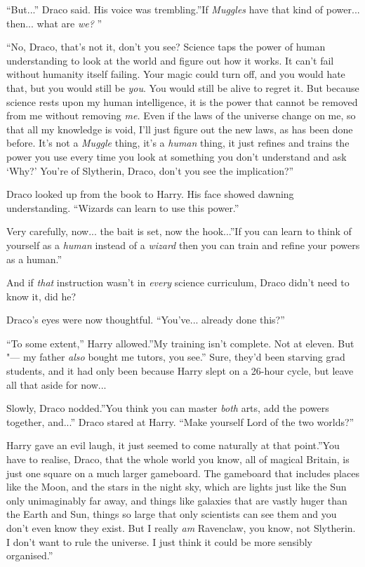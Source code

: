 ``But...'' Draco said. His voice was trembling.''If \emph{Muggles}
have that kind of power... then... what are \emph{we?} ''

``No, Draco, that's not it, don't you see? Science taps the power of
human understanding to look at the world and figure out how it works. It
can't fail without humanity itself failing. Your magic could turn off,
and you would hate that, but you would still be \emph{you}. You would
still be alive to regret it. But because science rests upon my human
intelligence, it is the power that cannot be removed from me without
removing \emph{me.} Even if the laws of the universe change on me, so
that all my knowledge is void, I'll just figure out the new laws, as has
been done before. It's not a \emph{Muggle} thing, it's a \emph{human}
thing, it just refines and trains the power you use every time you look
at something you don't understand and ask `Why?' You're of Slytherin,
Draco, don't you see the implication?''

Draco looked up from the book to Harry. His face showed dawning
understanding. ``Wizards can learn to use this power.''

Very carefully, now... the bait is set, now the hook...''If
you can learn to think of yourself as a \emph{human} instead of a
\emph{wizard} then you can train and refine your powers as a human.''

And if \emph{that} instruction wasn't in \emph{every} science
curriculum, Draco didn't need to know it, did he?

Draco's eyes were now thoughtful. ``You've... already done this?''

``To some extent,'' Harry allowed.''My training isn't complete. Not at
eleven. But "--- my father \emph{also} bought me tutors, you see.'' Sure,
they'd been starving grad students, and it had only been because Harry
slept on a 26-hour cycle, but leave all that aside for now...

Slowly, Draco nodded.''You think you can master \emph{both} arts, add
the powers together, and...'' Draco stared at Harry. ``Make
yourself Lord of the two worlds?''

Harry gave an evil laugh, it just seemed to come naturally at that
point.''You have to realise, Draco, that the whole world you know, all
of magical Britain, is just one square on a much larger gameboard. The
gameboard that includes places like the Moon, and the stars in the night
sky, which are lights just like the Sun only unimaginably far away, and
things like galaxies that are vastly huger than the Earth and Sun,
things so large that only scientists can see them and you don't even
know they exist. But I really \emph{am} Ravenclaw, you know, not
Slytherin. I don't want to rule the universe. I just think it could be
more sensibly organised.''

